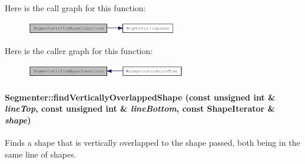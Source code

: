 Here is the call graph for this function:\nopagebreak
\begin{figure}[H]
\begin{center}
\leavevmode
\includegraphics[width=187pt]{class_segmenter_7f4ab775f61d92c4d051f6ef4685cf6f_cgraph}
\end{center}
\end{figure}


Here is the caller graph for this function:\nopagebreak
\begin{figure}[H]
\begin{center}
\leavevmode
\includegraphics[width=197pt]{class_segmenter_7f4ab775f61d92c4d051f6ef4685cf6f_icgraph}
\end{center}
\end{figure}
\hypertarget{class_segmenter_0961de0db6a0b1de51882024bfc830a1}{
\paragraph[{findVerticallyOverlappedShape}]{ Segmenter::findVerticallyOverlappedShape (const unsigned int \& {\em lineTop}, \/  const unsigned int \& {\em lineBottom}, \/  const {\bf ShapeIterator} \& {\em shape})}\hfill}
\label{class_segmenter_0961de0db6a0b1de51882024bfc830a1}


Finds a shape that is vertically overlapped to the shape passed, both being in the same line of shapes. 

